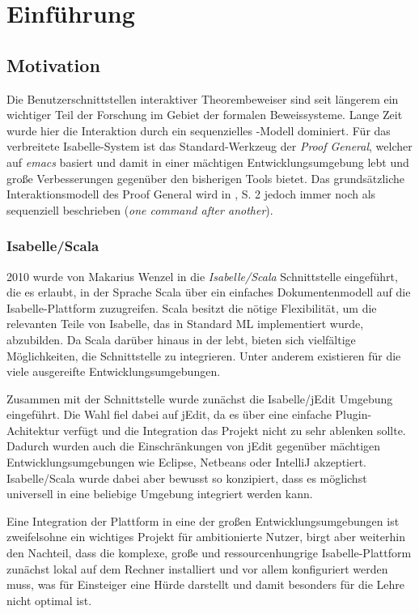 \chapter{Einführung}

\section{Motivation}

Die Benutzerschnittstellen interaktiver Theorembeweiser sind seit längerem ein wichtiger Teil der
Forschung im Gebiet der formalen Beweissysteme. Lange Zeit wurde hier die Interaktion durch ein
sequenzielles \textit{}-Modell dominiert. Für das verbreitete Isabelle-System ist das
Standard-Werkzeug der \textit{Proof General}, welcher auf \textit{emacs} basiert und damit in einer
mächtigen Entwicklungsumgebung lebt und große Verbesserungen gegenüber den bisherigen Tools bietet.
Das grundsätzliche Interaktionsmodell des Proof General wird in \cite{iscala}, S. 2 jedoch immer
noch als sequenziell beschrieben (\textit{\glqq one command after another\grqq}).

\subsection{Isabelle/Scala}

2010 wurde von Makarius Wenzel in \cite{iscala} die \textit{Isabelle/Scala} Schnittstelle
eingeführt, die es erlaubt, in der Sprache Scala über ein einfaches Dokumentenmodell auf die
Isabelle-Plattform zuzugreifen. Scala besitzt die nötige Flexibilität, um die relevanten Teile von
Isabelle, das in Standard ML implementiert wurde, abzubilden. Da Scala darüber hinaus in der
 lebt, bieten sich vielfältige Möglichkeiten, die Schnittstelle zu integrieren. Unter
anderem existieren für die  viele ausgereifte Entwicklungsumgebungen.

Zusammen mit der Schnittstelle wurde zunächst die Isabelle/jEdit Umgebung eingeführt. Die Wahl fiel
dabei auf jEdit, da es über eine einfache Plugin-Achitektur verfügt und die Integration das Projekt
nicht zu sehr ablenken sollte. Dadurch wurden auch die Einschränkungen von jEdit gegenüber mächtigen
Entwicklungsumgebungen wie Eclipse, Netbeans oder IntelliJ akzeptiert. Isabelle/Scala wurde dabei
aber bewusst so konzipiert, dass es möglichst universell in eine beliebige Umgebung integriert
werden kann.

Eine Integration der Plattform in eine der großen Entwicklungsumgebungen ist zweifelsohne ein
wichtiges Projekt für ambitionierte Nutzer, birgt aber weiterhin den Nachteil, dass die komplexe,
große und ressourcenhungrige Isabelle-Plattform zunächst lokal auf dem Rechner installiert und vor
allem konfiguriert werden muss, was für Einsteiger eine Hürde darstellt und damit besonders für die
Lehre nicht optimal ist.


